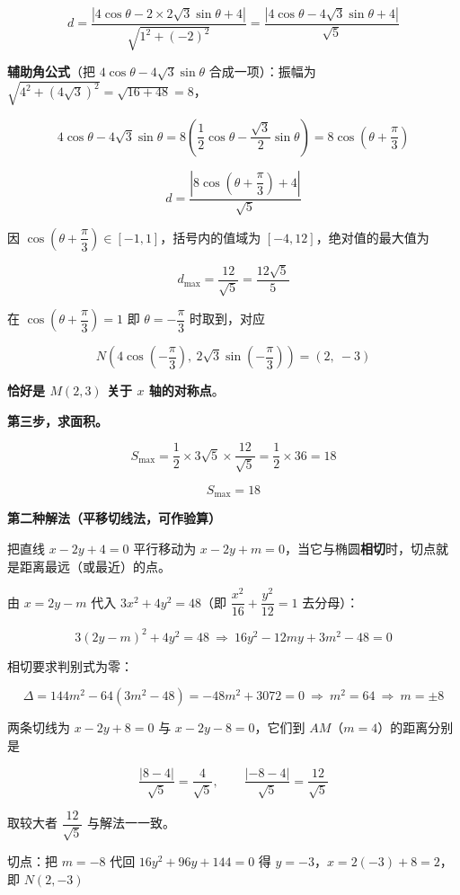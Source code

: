 \[d=\frac{\left|4\cos\theta-2\times2\sqrt3\sin\theta+4\right|}{\sqrt{1^{2}+(-2)^{2}}}=\frac{\left|4\cos\theta-4\sqrt3\sin\theta+4\right|}{\sqrt5}\]

\textbf{辅助角公式}（把 $4\cos\theta-4\sqrt3\sin\theta$ 合成一项）：振幅为 $\sqrt{4^{2}+\left(4\sqrt3\right)^{2}}=\sqrt{16+48}=8$，

\[4\cos\theta-4\sqrt3\sin\theta=8\left(\frac12\cos\theta-\frac{\sqrt3}2\sin\theta\right)=8\cos\left(\theta+\frac\pi3\right)\]

\[d=\frac{\left|8\cos\left(\theta+\dfrac\pi3\right)+4\right|}{\sqrt5}\]

因 $\cos\left(\theta+\dfrac\pi3\right)\in[-1,1]$，括号内的值域为 $[-4,12]$，绝对值的最大值为

\[d_{\max}=\frac{12}{\sqrt5}=\frac{12\sqrt5}5\]

在 $\cos\left(\theta+\dfrac\pi3\right)=1$ 即 $\theta=-\dfrac\pi3$ 时取到，对应

\[N\left(4\cos\left(-\frac\pi3\right),\ 2\sqrt3\sin\left(-\frac\pi3\right)\right)=(2,\ -3)\]

\textbf{恰好是 $M(2,3)$ 关于 $x$ 轴的对称点}。

\textbf{第三步，求面积。}

\[S_{\max}=\frac12\times3\sqrt5\times\frac{12}{\sqrt5}=\frac12\times36=18\]

\[\boxed{S_{\max}=18}\]

\par\medskip

\textbf{第二种解法（平移切线法，可作验算）}

把直线 $x-2y+4=0$ 平行移动为 $x-2y+m=0$，当它与椭圆\textbf{相切}时，切点就是距离最远（或最近）的点。

由 $x=2y-m$ 代入 $3x^{2}+4y^{2}=48$（即 $\dfrac{x^{2}}{16}+\dfrac{y^{2}}{12}=1$ 去分母）：

\[3(2y-m)^{2}+4y^{2}=48\ \Longrightarrow\ 16y^{2}-12my+3m^{2}-48=0\]

相切要求判别式为零：

\[\Delta=144m^{2}-64\left(3m^{2}-48\right)=-48m^{2}+3072=0\ \Longrightarrow\ m^{2}=64\ \Longrightarrow\ m=\pm8\]

两条切线为 $x-2y+8=0$ 与 $x-2y-8=0$，它们到 $AM$（$m=4$）的距离分别是

\[\frac{|8-4|}{\sqrt5}=\frac4{\sqrt5},\qquad \frac{|-8-4|}{\sqrt5}=\frac{12}{\sqrt5}\]

取较大者 $\dfrac{12}{\sqrt5}$  与解法一一致。

切点：把 $m=-8$ 代回 $16y^{2}+96y+144=0$ 得 $y=-3$，$x=2(-3)+8=2$，即 $N(2,-3)$ 

